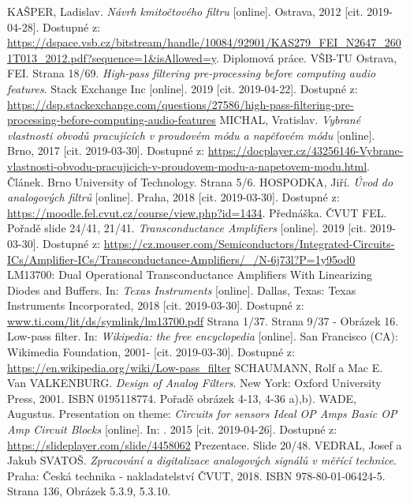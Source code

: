 \documentclass[twoside]{article}
\begin{document}
\begin{thebibliography}{999}
KAŠPER, Ladislav. \textit{Návrh kmitočtového filtru} [online]. Ostrava, 2012 [cit. 2019-04-28]. Dostupné z: \url{https://dspace.vsb.cz/bitstream/handle/10084/92901/KAS279_FEI_N2647_2601T013_2012.pdf?sequence=1&isAllowed=y}. Diplomová práce. VŠB-TU Ostrava, FEI. Strana 18/69.
\textit{High-pass filtering pre-processing before computing audio features}. Stack Exchange Inc [online]. 2019 [cit. 2019-04-22]. Dostupné z: \url{https://dsp.stackexchange.com/questions/27586/high-pass-filtering-pre-processing-before-computing-audio-features}
MICHAL, Vratislav. \textit{Vybrané vlastnosti obvodů pracujících v proudovém módu a napěťovém módu} [online]. Brno, 2017 [cit. 2019-03-30]. Dostupné z: \url{https://docplayer.cz/43256146-Vybrane-vlastnosti-obvodu-pracujicich-v-proudovem-modu-a-napetovem-modu.html}. Článek. Brno University of Technology. Strana 5/6.
HOSPODKA, Jiří. \textit{Úvod do analogových filtrů} [online]. Praha, 2018 [cit. 2019-03-30]. Dostupné z: \url{https://moodle.fel.cvut.cz/course/view.php?id=1434}. Přednáška. ČVUT FEL. Pořadě slide 24/41, 21/41.
\textit{Transconductance Amplifiers} [online]. 2019 [cit. 2019-03-30]. Dostupné z: \url{https://cz.mouser.com/Semiconductors/Integrated-Circuits-ICs/Amplifier-ICs/Transconductance-Amplifiers/_/N-6j73l?P=1y95od0}
LM13700: Dual Operational Transconductance Amplifiers With Linearizing Diodes and Buffers. In: \textit{Texas Instruments} [online]. Dallas, Texas: Texas Instruments Incorporated, 2018 [cit. 2019-03-30]. Dostupné z: \url{www.ti.com/lit/ds/symlink/lm13700.pdf} Strana 1/37. Strana 9/37 - Obrázek 16.
Low-pass filter. In: \textit{Wikipedia: the free encyclopedia} [online]. San Francisco (CA): Wikimedia Foundation, 2001- [cit. 2019-03-30]. Dostupné z: \url{https://en.wikipedia.org/wiki/Low-pass_filter}
SCHAUMANN, Rolf a Mac E. Van VALKENBURG. \textit{Design of Analog Filters}. New York: Oxford University Press, 2001. ISBN 0195118774. Pořadě obrázek 4-13, 4-36 a),b).
WADE, Augustus. Presentation on theme: \textit{Circuits for sensors Ideal OP Amps Basic OP Amp Circuit Blocks} [online]. In: . 2015 [cit. 2019-04-26]. Dostupné z: \url{https://slideplayer.com/slide/4458062} Prezentace. Slide 20/48.
VEDRAL, Josef a Jakub SVATOŠ. \textit{Zpracování a digitalizace analogových signálů v měřící technice}. Praha: Česká technika - nakladatelství ČVUT, 2018. ISBN 978-80-01-06424-5. Strana 136, Obrázek 5.3.9, 5.3.10.
\end{thebibliography}
\end{document}
